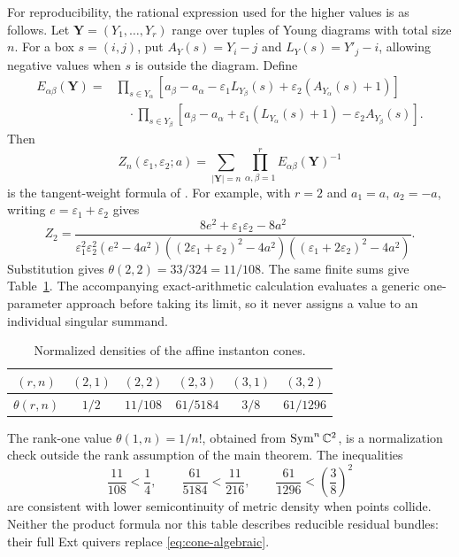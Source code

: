 For reproducibility, the rational expression used for the higher values
is as follows. Let $\mathbf Y=(Y_1,\ldots,Y_r)$ range over tuples of Young
diagrams with total size $n$. For a box $s=(i,j)$, put
$A_Y(s)=Y_i-j$ and $L_Y(s)=Y'_j-i$, allowing negative values when $s$ is
outside the diagram. Define
\begin{align*}
 E_{\alpha\beta}(\mathbf Y)
 ={}&\prod_{s\in Y_\alpha}
 [a_\beta-a_\alpha-\varepsilon_1L_{Y_\beta}(s)
                     +\varepsilon_2(A_{Y_\alpha}(s)+1)]\\
 &\quad\cdot\prod_{s\in Y_\beta}
 [a_\beta-a_\alpha+\varepsilon_1(L_{Y_\alpha}(s)+1)
                     -\varepsilon_2A_{Y_\beta}(s)].
\end{align*}
Then
\begin{equation}\label{eq:localization}
 Z_n(\varepsilon_1,\varepsilon_2;a)
       =\sum_{|\mathbf Y|=n}\prod_{\alpha,\beta=1}^r
                                  E_{\alpha\beta}(\mathbf Y)^{-1}
\end{equation}
is the tangent-weight formula of \cite[Theorem~2.11]{NY05}.
For example, with $r=2$ and $a_1=a$, $a_2=-a$, writing
$e=\varepsilon_1+\varepsilon_2$ gives
\[
 Z_2=
 \frac{8e^2+\varepsilon_1\varepsilon_2-8a^2}
 {\varepsilon_1^2\varepsilon_2^2(e^2-4a^2)
 ((2\varepsilon_1+\varepsilon_2)^2-4a^2)
 ((\varepsilon_1+2\varepsilon_2)^2-4a^2)}.
\]
Substitution gives $\theta(2,2)=33/324=11/108$.
The same finite sums give Table~\ref{tab:densities}.
The accompanying exact-arithmetic calculation evaluates a generic
one-parameter approach before taking its limit, so it never assigns a
value to an individual singular summand.

\begin{table}[ht]
\centering
\caption{Normalized densities of the affine instanton cones.}\label{tab:densities}
\begin{tabular}{c@{\qquad}ccccc}
\toprule
$(r,n)$ & $(2,1)$ & $(2,2)$ & $(2,3)$ & $(3,1)$ & $(3,2)$\\
\midrule
$\theta(r,n)$ & $1/2$ & $11/108$ & $61/5184$ & $3/8$ & $61/1296$\\
\bottomrule
\end{tabular}
\end{table}

The rank-one value $\theta(1,n)=1/n!$, obtained from
$\operatorname{Sym}^n\mathbb C^2$, is a normalization check outside the rank assumption of the
main theorem. The inequalities
\[
 \frac{11}{108}<\frac14,\qquad
 \frac{61}{5184}<\frac{11}{216},\qquad
 \frac{61}{1296}<\left(\frac38\right)^2
\]
are consistent with lower semicontinuity of metric density when points
collide. Neither the product formula nor this table describes reducible
residual bundles: their full Ext quivers replace
\eqref{eq:cone-algebraic}.
